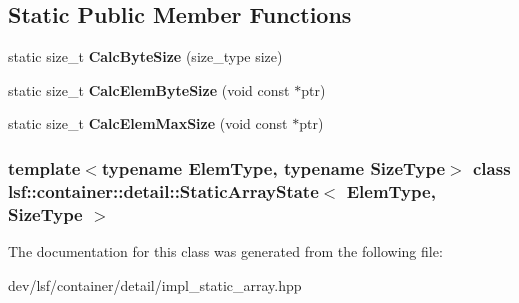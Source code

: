 \subsection*{Static Public Member Functions}
\begin{DoxyCompactItemize}
\item 
\hypertarget{classlsf_1_1container_1_1detail_1_1StaticArrayState_aeab1da21d81c0395a5df89946ebf563c}{
static size\_\-t {\bfseries CalcByteSize} (size\_\-type size)}
\label{classlsf_1_1container_1_1detail_1_1StaticArrayState_aeab1da21d81c0395a5df89946ebf563c}

\item 
\hypertarget{classlsf_1_1container_1_1detail_1_1StaticArrayState_abe99d753c95e661af2fcf56ce4c43a3b}{
static size\_\-t {\bfseries CalcElemByteSize} (void const $\ast$ptr)}
\label{classlsf_1_1container_1_1detail_1_1StaticArrayState_abe99d753c95e661af2fcf56ce4c43a3b}

\item 
\hypertarget{classlsf_1_1container_1_1detail_1_1StaticArrayState_a98ba244459b95c56b80859b8c5703427}{
static size\_\-t {\bfseries CalcElemMaxSize} (void const $\ast$ptr)}
\label{classlsf_1_1container_1_1detail_1_1StaticArrayState_a98ba244459b95c56b80859b8c5703427}

\end{DoxyCompactItemize}
\subsubsection*{template$<$typename ElemType, typename SizeType$>$ class lsf::container::detail::StaticArrayState$<$ ElemType, SizeType $>$}



The documentation for this class was generated from the following file:\begin{DoxyCompactItemize}
\item 
dev/lsf/container/detail/impl\_\-static\_\-array.hpp\end{DoxyCompactItemize}
